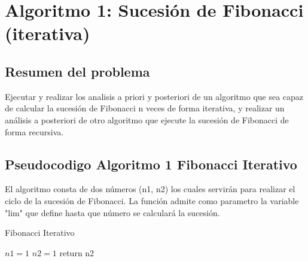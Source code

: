     
\newpage
\section{Algoritmo 1: Sucesión de Fibonacci (iterativa)}
    \subsection{Resumen del problema}
        Ejecutar y realizar los analisis a priori y posteriori de un algoritmo que sea capaz de calcular la sucesión de Fibonacci n veces de forma iterativa, y realizar un análisis a posteriori de otro algoritmo que ejecute la sucesión de Fibonacci de forma recursiva.
        
    \subsection{Pseudocodigo Algoritmo 1 Fibonacci Iterativo}
        El algoritmo consta de dos números (n1, n2) los cuales servirán para realizar el ciclo de la sucesión de Fibonacci. La función admite como parametro la variable "lim" que define hasta que número se calculará la sucesión.  
        \begin{algorithm}
            \caption{Fibonacci Iterativo
            }\label{alg:two}
            $n1 = 1$ \;
            $n2 = 1$ \;
            return n2\;
           
        \end{algorithm}


